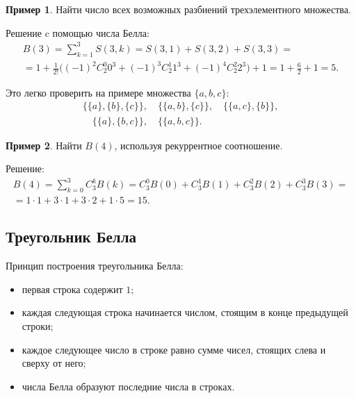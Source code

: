 \documentclass[a5paper, 11pt]{extarticle}
\theoremstyle{definition}
\newtheorem{example}{Пример}[subsection]
\theoremstyle{definition}
\theoremstyle{definition}
\numberwithin{figure}{section}
\numberwithin{table}{section}
\begin{document}
\begin{example}
    Найти число всех возможных разбиений трехэлементного множества.

    Решение c помощью числа Белла:
    \begin{gather*}
        B(3) =
        \sum_{k = 1}^3 S(3, k) =
        S(3, 1) + S(3, 2) + S(3, 3) = \\ =
        1 + \frac{1}{2!} \Big( (-1)^2 C_2^0 0^3 + (-1)^3 C_2^1 1^3 + (-1)^4 C_2^2 2^3 \Big) + 1 =
        1 + \frac{6}{2} + 1 = 5.
    \end{gather*}

    Это легко проверить на примере множества \(\{a, b, c\}\):
    \begin{gather*}
        \{\{a\}, \{b\}, \{c\}\},
        \quad
        \{\{a, b\}, \{c\}\},
        \quad
        \{\{a, c\}, \{b\}\}, \\
        \quad
        \{\{a\}, \{b, c\}\},
        \quad
        \{\{a, b, c\}\}.
    \end{gather*}
\end{example}

\begin{example}
    Найти \(B(4)\), используя рекуррентное соотношение.

    Решение:
    \begin{gather*}
        B(4) =
        \sum_{k = 0}^3 C_3^k B(k) =
        C_3^0 B(0) + C_3^1 B(1) + C_3^2 B(2) + C_3^3 B(3) = \\ =
        1 \cdot 1 + 3 \cdot 1 + 3 \cdot 2 + 1 \cdot 5 =
        15.
    \end{gather*}
\end{example}

\subsection{Треугольник Белла}

\noindent Принцип построения треугольника Белла:
\begin{itemize}
    \item первая строка содержит \(1\);
    \item каждая следующая строка начинается числом, стоящим в конце предыдущей строки;
    \item каждое следующее число в строке равно сумме чисел, стоящих слева и сверху от него;
    \item числа Белла образуют последние числа в строках.
\end{itemize}
\end{document}
